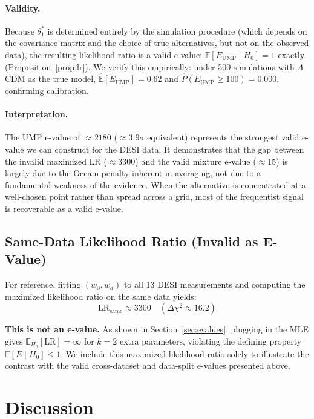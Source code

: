\documentclass[11pt,a4paper]{article}
\newcommand{\E}{\mathbb{E}}
\newcommand{\LCDM}{$\Lambda$CDM}
\begin{document}
\paragraph{Validity.} Because $\theta_1^*$ is determined entirely by the simulation procedure (which depends on the covariance matrix and the choice of true alternatives, but not on the observed data), the resulting likelihood ratio is a valid e-value: $\E[E_{\text{UMP}} \mid H_0] = 1$ exactly (Proposition~\ref{prop:lr}). We verify this empirically: under 500 simulations with \LCDM{} as the true model, $\hat{\E}[E_{\text{UMP}}] = 0.62$ and $\hat{P}(E_{\text{UMP}} \geq 100) = 0.000$, confirming calibration.

\paragraph{Interpretation.} The UMP e-value of $\approx 2180$ ($\approx 3.9\sigma$ equivalent) represents the strongest valid e-value we can construct for the DESI data. It demonstrates that the gap between the invalid maximized LR ($\approx 3300$) and the valid mixture e-value ($\approx 15$) is largely due to the Occam penalty inherent in averaging, not due to a fundamental weakness of the evidence. When the alternative is concentrated at a well-chosen point rather than spread across a grid, most of the frequentist signal is recoverable as a valid e-value.

\subsection{Same-Data Likelihood Ratio (Invalid as E-Value)}
\label{sec:samedata}

For reference, fitting $(w_0, w_a)$ to all 13 DESI measurements and computing the maximized likelihood ratio on the same data yields:
\begin{equation}
\text{LR}_{\text{same}} \approx 3300 \quad (\Delta\chi^2 \approx 16.2)
\end{equation}

\textbf{This is not an e-value.} As shown in Section~\ref{sec:evalues}, plugging in the MLE gives $\E_{H_0}[\text{LR}] = \infty$ for $k=2$ extra parameters, violating the defining property $\E[E \mid H_0] \leq 1$. We include this maximized likelihood ratio solely to illustrate the contrast with the valid cross-dataset and data-split e-values presented above.

\section{Discussion}
\label{sec:discussion}
\end{document}

